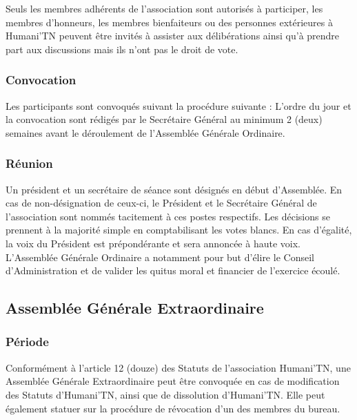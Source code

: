 \documentclass[12pt]{article}
\begin{document}
Seuls les membres adhérents de l’association sont autorisés à participer, les membres d’honneurs, les
membres bienfaiteurs ou des personnes extérieures à Humani'TN peuvent être invités à assister aux
délibérations ainsi qu’à prendre part aux discussions mais ils n’ont pas le droit de vote.

\subsubsection{Convocation}
\label{sec:entites_decisionnelles:ago:convocation}

Les participants sont convoqués suivant la procédure suivante :
L’ordre du jour et la convocation sont rédigés par le Secrétaire Général au minimum 2 (deux) semaines avant
le déroulement de l’Assemblée Générale Ordinaire.

\subsubsection{Réunion}
\label{sec:entites_decisionnelles:ago:reunion}

Un président et un secrétaire de séance sont désignés en début d’Assemblée. En cas de non-désignation de
ceux-ci, le Président et le Secrétaire Général de l’association sont nommés tacitement à ces postes respectifs.
Les décisions se prennent à la majorité simple en comptabilisant les votes blancs. En cas d’égalité, la voix du
Président est prépondérante et sera annoncée à haute voix.
L’Assemblée Générale Ordinaire a notamment pour but d’élire le Conseil d’Administration et de valider les
quitus moral et financier de l’exercice écoulé.

\subsection{Assemblée Générale Extraordinaire}
\label{sec:entites_decisionnelles:age}

\subsubsection{Période}
\label{sec:entites_decisionnelles:age:periode}

Conformément à l’article 12 (douze) des Statuts de l’association Humani'TN, une Assemblée Générale
Extraordinaire peut être convoquée en cas de modification des Statuts d’Humani'TN, ainsi que de dissolution
d’Humani'TN. Elle peut également statuer sur la procédure de révocation d’un des membres du bureau.
\end{document}
